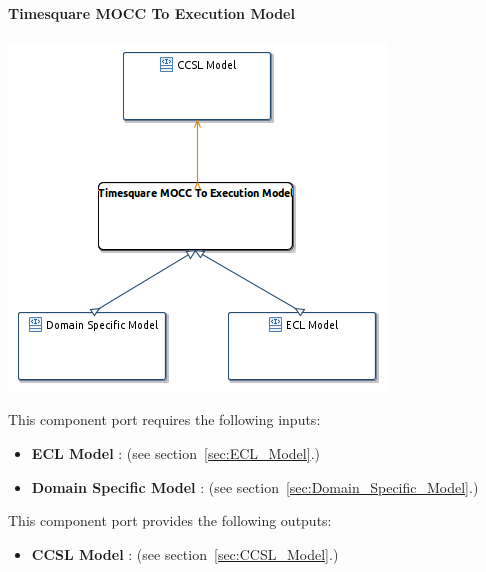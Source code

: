 \documentclass{gemoc} %
\begin{document}
\paragraph{Timesquare MOCC To Execution Model}
\label{sec:Timesquare_MOCC_To_Execution_Model}


\begin{center}
\includegraphics*[trim=0.0cm 0.0cm 0cm 0.0cm, clip=true]{../images/generated/Generated_Timesquare_MOCC_To_Execution_Model.png}
\end{center}

This component port requires the following inputs:
\begin{itemize}
  \item \textbf{ECL Model} :
(see section~\ref{sec:ECL_Model}.)
  \item \textbf{Domain Specific Model} :
(see section~\ref{sec:Domain_Specific_Model}.)
\end{itemize}

This component port provides the following outputs:
\begin{itemize}
  \item \textbf{CCSL Model} :
(see section~\ref{sec:CCSL_Model}.)
\end{itemize}
\end{document}
